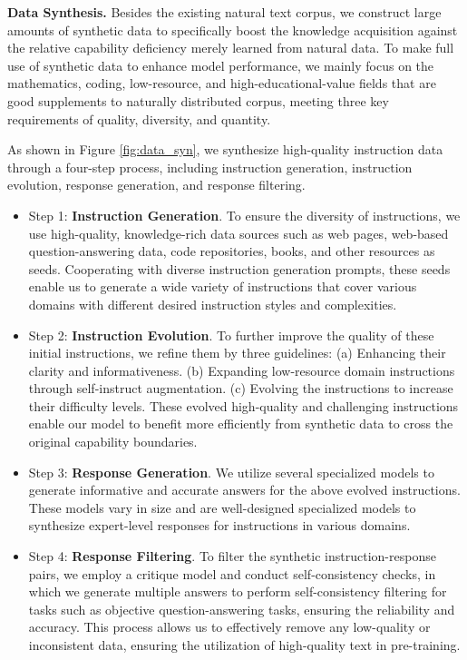 \documentclass{article}
\begin{document}
\textbf{Data Synthesis.}
Besides the existing natural text corpus, we construct large amounts of synthetic data to specifically boost the knowledge acquisition against the relative capability deficiency merely learned from natural data. To make full use of synthetic data to enhance model performance, we mainly focus on the mathematics, coding, low-resource, and high-educational-value fields that are good supplements to naturally distributed corpus, meeting three key requirements of quality, diversity, and quantity.

As shown in Figure \ref{fig:data_syn}, we synthesize high-quality instruction data through a four-step process, including instruction generation, instruction evolution, response generation, and response filtering.
\begin{itemize}[leftmargin=10pt]
    \item Step 1: \textbf{Instruction Generation}. To ensure the diversity of instructions, we use high-quality, knowledge-rich data sources such as web pages, web-based question-answering data, code repositories, books, and other resources as seeds. Cooperating with diverse instruction generation prompts, these seeds enable us to generate a wide variety of instructions that cover various domains with different desired instruction styles and complexities.
    \item Step 2: \textbf{Instruction Evolution}. To further improve the quality of these initial instructions, we refine them by three guidelines: (a) Enhancing their clarity and informativeness. (b) Expanding low-resource domain instructions through self-instruct augmentation. (c) Evolving the instructions to increase their difficulty levels. These evolved high-quality and challenging instructions enable our model to benefit more efficiently from synthetic data to cross the original capability boundaries.
    \item Step 3: \textbf{Response Generation}. We utilize several specialized models to generate informative and accurate answers for the above evolved instructions. These models vary in size and are well-designed specialized models to synthesize expert-level responses for instructions in various domains.
    \item Step 4: \textbf{Response Filtering}. To filter the synthetic instruction-response pairs, we employ a critique model and conduct self-consistency checks, in which we generate multiple answers to perform self-consistency filtering for tasks such as objective question-answering tasks, ensuring the reliability and accuracy. This process allows us to effectively remove any low-quality or inconsistent data, ensuring the utilization of high-quality text in pre-training.

\end{itemize}
\end{document}
